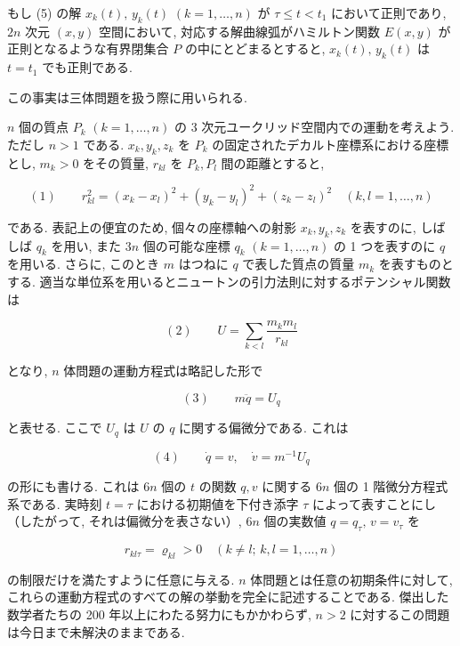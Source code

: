 \documentclass[dvipdfmx, leqno]{jsbook}
\begin{document}
もし (5) の解 $x_k(t), \, y_k(t)$ $(k=1,\dots,n)$ が $\tau \leq t < t_1$ において正則であり, $2n$ 次元 $(x, y)$ 空間において, 対応する解曲線弧がハミルトン関数 $E(x, y)$ が正則となるような有界閉集合 $P$ の中にとどまるとすると, $x_k(t), \, y_k(t)$ は $t = t_1$ でも正則である.

この事実は三体問題を扱う際に用いられる.


$n$ 個の質点 $P_k$ $(k=1,\dots,n)$ の 3 次元ユークリッド空間内での運動を考えよう. ただし $n > 1$ である. $x_k, y_k, z_k$ を $P_k$ の固定されたデカルト座標系における座標とし, $m_k > 0$ をその質量, $r_{kl}$ を $P_k, P_l$ 間の距離とすると,

$$(1) \qquad r_{kl}^2 = (x_k - x_l)^2 + (y_k - y_l)^2 + (z_k - z_l)^2 \quad (k,l=1,\dots,n)$$

である. 表記上の便宜のため, 個々の座標軸への射影 $x_k, y_k, z_k$ を表すのに, しばしば $q_k$ を用い, また $3n$ 個の可能な座標 $q_k$ $(k=1,\dots,n)$ の 1 つを表すのに $q$ を用いる. さらに, このとき $m$ はつねに $q$ で表した質点の質量 $m_k$ を表すものとする. 適当な単位系を用いるとニュートンの引力法則に対するポテンシャル関数は

$$(2) \qquad U = \sum_{k<l} \frac{m_k m_l}{r_{kl}}$$

となり, $n$ 体問題の運動方程式は略記した形で

$$(3) \qquad m\ddot{q} = U_q$$

と表せる. ここで $U_q$ は $U$ の $q$ に関する偏微分である. これは

$$(4) \qquad \dot{q} = v, \quad \dot{v} = m^{-1} U_q$$


の形にも書ける. これは $6n$ 個の $t$ の関数 $q, v$ に関する $6n$ 個の 1 階微分方程式系である. 実時刻 $t = \tau$ における初期値を下付き添字 $\tau$ によって表すことにし（したがって, それは偏微分を表さない）, $6n$ 個の実数値 $q = q_\tau, \, v = v_\tau$ を

$$r_{kl\tau} = \varrho_{kl} > 0 \quad (k \neq l; \, k, l = 1, \dots, n)$$

の制限だけを満たすように任意に与える. $n$ 体問題とは任意の初期条件に対して, これらの運動方程式のすべての解の挙動を完全に記述することである. 傑出した数学者たちの 200 年以上にわたる努力にもかかわらず, $n > 2$ に対するこの問題は今日まで未解決のままである.
\end{document}
